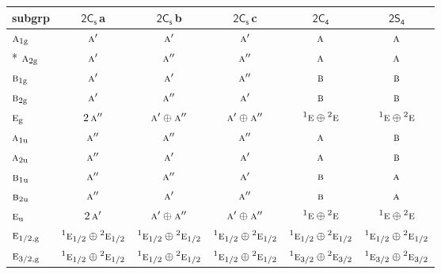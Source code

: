 \documentclass[10pt,a4paper]{article}
\numberwithin{equation}{section}
\newcommand{\grp}[1]{\mathsf{#1}}
\newcommand{\irr}[1]{\text{\normalfont\scshape #1}}
\newcommand{\conjpair}[1]{{}^{#1}}
\newcommand{\ptag}[1]{\mathrm{#1}}
\newcommand{\clsletter}[1]{\,{\scriptsize\color{black!55}#1}}
\begin{document}
{\small\begin{longtable}{@{}lccccc@{}}\toprule
subgrp & \href{2C1v.pdf}{$\grp{2C_{s}}$}\clsletter{a} & \href{2C1v.pdf}{$\grp{2C_{s}}$}\clsletter{b} & \href{2C1v.pdf}{$\grp{2C_{s}}$}\clsletter{c} & \href{2C4.pdf}{$\grp{2C_{4}}$} & \href{2S4.pdf}{$\grp{2S_{4}}$}\\\midrule\endhead
\bottomrule\endfoot\endlastfoot
$\irr{a}_{1\ptag{g}}$ & $\irr{a}'$ & $\irr{a}'$ & $\irr{a}'$ & $\irr{a}$ & $\irr{a}$\\*
$\irr{a}_{2\ptag{g}}$ & $\irr{a}'$ & $\irr{a}''$ & $\irr{a}''$ & $\irr{a}$ & $\irr{a}$\\
$\irr{b}_{1\ptag{g}}$ & $\irr{a}'$ & $\irr{a}'$ & $\irr{a}''$ & $\irr{b}$ & $\irr{b}$\\
$\irr{b}_{2\ptag{g}}$ & $\irr{a}'$ & $\irr{a}''$ & $\irr{a}'$ & $\irr{b}$ & $\irr{b}$\\
$\irr{e}_{\ptag{g}}$ & $2\,\irr{a}''$ & $\irr{a}'\oplus \irr{a}''$ & $\irr{a}'\oplus \irr{a}''$ & $\conjpair{1}\irr{e}\oplus \conjpair{2}\irr{e}$ & $\conjpair{1}\irr{e}\oplus \conjpair{2}\irr{e}$\\
$\irr{a}_{1\ptag{u}}$ & $\irr{a}''$ & $\irr{a}''$ & $\irr{a}''$ & $\irr{a}$ & $\irr{b}$\\
$\irr{a}_{2\ptag{u}}$ & $\irr{a}''$ & $\irr{a}'$ & $\irr{a}'$ & $\irr{a}$ & $\irr{b}$\\
$\irr{b}_{1\ptag{u}}$ & $\irr{a}''$ & $\irr{a}''$ & $\irr{a}'$ & $\irr{b}$ & $\irr{a}$\\
$\irr{b}_{2\ptag{u}}$ & $\irr{a}''$ & $\irr{a}'$ & $\irr{a}''$ & $\irr{b}$ & $\irr{a}$\\
$\irr{e}_{\ptag{u}}$ & $2\,\irr{a}'$ & $\irr{a}'\oplus \irr{a}''$ & $\irr{a}'\oplus \irr{a}''$ & $\conjpair{1}\irr{e}\oplus \conjpair{2}\irr{e}$ & $\conjpair{1}\irr{e}\oplus \conjpair{2}\irr{e}$\\
$\irr{e}_{1/2,\ptag{g}}$ & $\conjpair{1}\irr{e}_{1/2}\oplus \conjpair{2}\irr{e}_{1/2}$ & $\conjpair{1}\irr{e}_{1/2}\oplus \conjpair{2}\irr{e}_{1/2}$ & $\conjpair{1}\irr{e}_{1/2}\oplus \conjpair{2}\irr{e}_{1/2}$ & $\conjpair{1}\irr{e}_{1/2}\oplus \conjpair{2}\irr{e}_{1/2}$ & $\conjpair{1}\irr{e}_{1/2}\oplus \conjpair{2}\irr{e}_{1/2}$\\
$\irr{e}_{3/2,\ptag{g}}$ & $\conjpair{1}\irr{e}_{1/2}\oplus \conjpair{2}\irr{e}_{1/2}$ & $\conjpair{1}\irr{e}_{1/2}\oplus \conjpair{2}\irr{e}_{1/2}$ & $\conjpair{1}\irr{e}_{1/2}\oplus \conjpair{2}\irr{e}_{1/2}$ & $\conjpair{1}\irr{e}_{3/2}\oplus \conjpair{2}\irr{e}_{3/2}$ & $\conjpair{1}\irr{e}_{3/2}\oplus \conjpair{2}\irr{e}_{3/2}$\\

\end{longtable}}
\end{document}
